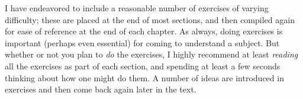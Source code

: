 I have endeavored to include a reasonable number of exercises of varying difficulty; these are placed at the end of most sections, and then compiled again for ease of reference at the end of each chapter.
As always, doing exercises is important (perhaps even essential) for coming to understand a subject.
But whether or not you plan to \emph{do} the exercises, I highly recommend at least \emph{reading} all the exercises as part of each section, and spending at least a few seconds thinking about how one might do them.
A number of ideas are introduced in exercises and then come back again later in the text.


